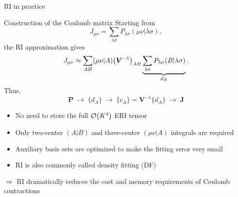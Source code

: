\documentclass[aspectratio=169,9pt]{beamer}
\newcommand{\bJ}{\boldsymbol{J}}
\newcommand{\bP}{\boldsymbol{P}}
\newcommand{\bV}{\boldsymbol{V}}
\newcommand{\rbraket}[2]{( #1 | #2 )}
\begin{document}
\begin{frame}{RI in practice}
	\begin{block}{Construction of the Coulomb matrix}
		Starting from
		\begin{equation*}
			J_{\mu\nu}
			=
			\sum_{\lambda\sigma}
			P_{\lambda\sigma}
			\rbraket{\mu\nu}{\lambda\sigma},
		\end{equation*}
		the RI approximation gives
		\begin{equation*}
			J_{\mu\nu}
			\approx
			\sum_{AB}
			\rbraket{\mu\nu}{A}
			\qty(\bV^{-1})_{AB}
			\underbrace{
				\sum_{\lambda\sigma}
				P_{\lambda\sigma}
				\rbraket{B}{\lambda\sigma}
			}_{d_B}.
		\end{equation*}
		Thus,
		\begin{equation*}
			\boxed{
				\bP
				\;\longrightarrow\;
				\{d_A\}
				\;\longrightarrow\;
				\{c_A\}=\bV^{-1}\{d_A\}
				\;\longrightarrow\;
				\bJ
			}
		\end{equation*}
	\end{block}
	\vfill
	\begin{itemize}
		\item No need to store the full $\order{K^4}$ ERI tensor
		\item Only \alert{two-center} $\rbraket{A}{B}$ and \alert{three-center} $\rbraket{\mu\nu}{A}$ integrals are required
		\item Auxiliary basis sets are optimized to make the fitting error very small
		\item RI is also commonly called \alert{density fitting (DF)}
	\end{itemize}
	\vfill
	\centering
	$\Rightarrow$
	\alert{RI dramatically reduces the cost and memory requirements of Coulomb contractions}
\end{frame}
\end{document}
